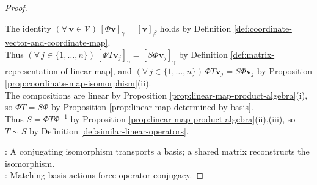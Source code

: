 \begin{proposition}
\begin{proof}
\begin{enumerate}[label=\roman*.]
The identity $(\forall\,\mathbf{v}\in\mathcal{V})\,[\Phi\mathbf{v}]_{\gamma}=[\mathbf{v}]_{\beta}$ holds by Definition \ref{def:coordinate-vector-and-coordinate-map}.\\
Thus $(\forall\,j\in\{1,\ldots,n\})\,[\Phi T\mathbf{v}_j]_{\gamma}=[S\Phi\mathbf{v}_j]_{\gamma}$ by Definition \ref{def:matrix-representation-of-linear-map}, and $(\forall\,j\in\{1,\ldots,n\})\,\Phi T\mathbf{v}_j=S\Phi\mathbf{v}_j$ by Proposition \ref{prop:coordinate-map-isomorphism}(ii).\\
The compositions are linear by Proposition \ref{prop:linear-map-product-algebra}(i), so $\Phi T=S\Phi$ by Proposition \ref{prop:linear-map-determined-by-basis}.\\
Thus $S=\Phi T\Phi^{-1}$ by Proposition \ref{prop:linear-map-product-algebra}(ii),(iii), so $T\sim S$ by Definition \ref{def:similar-linear-operators}.
\end{enumerate}
: A conjugating isomorphism transports a basis; a shared matrix reconstructs the isomorphism.\\
: Matching basis actions force operator conjugacy.
\end{proof}
\end{proposition}

